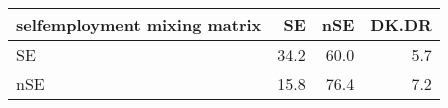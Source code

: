 \begin{table}[ht]
\centering
\begin{tabular}{lrrr}
  \hline
selfemployment mixing matrix  & SE & nSE & DK.DR \\ 
  \hline
SE & 34.2 & 60.0 & 5.7 \\ 
  nSE & 15.8 & 76.4 & 7.2 \\ 
   \hline
\end{tabular}
\end{table}
